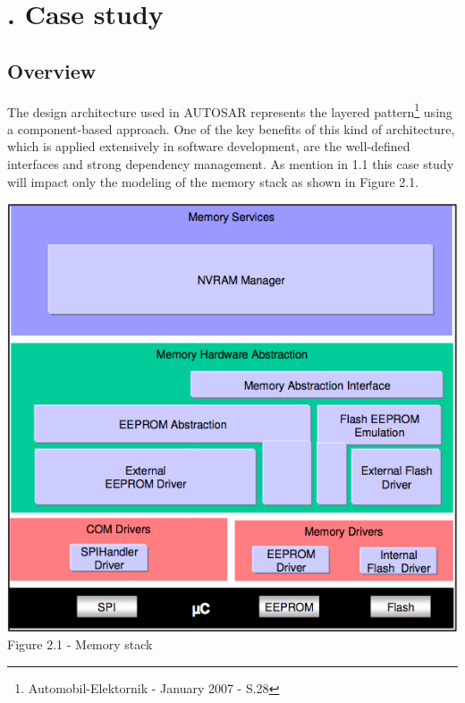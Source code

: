 \newpage
\chapter[Case study]{\thechapter. Case study}
\section{Overview}
The design architecture used in AUTOSAR represents the layered pattern\footnote{Automobil-Elektornik - January 2007 - S.28} using a component-based approach. One of the key benefits of this kind of architecture, which is applied extensively in software development, are the well-defined interfaces and strong dependency management.\newline
As mention in 1.1 this case study will impact only the modeling of the memory stack as shown in Figure 2.1.
\begin{center}
\includegraphics[scale=0.55]{Images/Figure2_1.png}\\
Figure 2.1 - Memory stack
\end{center}
\newpage

\newpage

\newpage

\newpage

